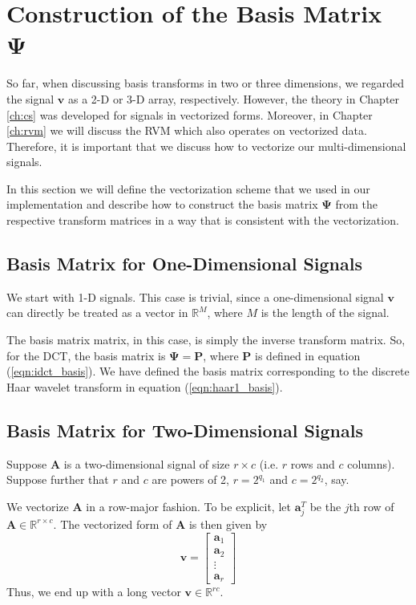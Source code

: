 \section{Construction of the Basis Matrix \texorpdfstring{$\bm\Psi$}{[Psi]}}
So far, when discussing basis transforms in two or three dimensions, we regarded the signal $\bm v$ as a 2-D or 3-D array, respectively.
However, the theory in Chapter \ref{ch:cs} was developed for signals in vectorized forms.
Moreover, in Chapter \ref{ch:rvm} we will discuss the RVM which also operates on vectorized data.
Therefore, it is important that we discuss how to vectorize our multi-dimensional signals.

In this section we will define the vectorization scheme that we used in our implementation and describe how to construct the basis matrix $\bm\Psi$ from the respective transform matrices in a way that is consistent with the vectorization.

\subsection{Basis Matrix for One-Dimensional Signals}
We start with 1-D signals. 
This case is trivial, since a one-dimensional signal $\bm v$ can directly be treated as a vector in $\mathbb{R}^M$, where $M$ is the length of the signal.

The basis matrix matrix, in this case, is simply the inverse transform matrix.
So, for the DCT, the basis matrix is $\bm\Psi = \bm P$, where $\bm P$ is defined in equation (\ref{eqn:idct_basis}).
We have defined the basis matrix corresponding to the discrete Haar wavelet transform in equation (\ref{eqn:haar1_basis}).

\subsection{Basis Matrix for Two-Dimensional Signals}
\label{sect:vectorize2d}
Suppose $\bm A$ is a two-dimensional signal of size $r\times c$ (i.e. $r$ rows and $c$ columns).
Suppose further that $r$ and $c$ are powers of 2, $r=2^{q_1}$ and $c = 2^{q_2}$, say.

We vectorize $\bm A$ in a row-major fashion.
To be explicit, let $\bm a_j^T$ be the $j$th row of $\bm A\in\mathbb{R}^{r\times c}$.
The vectorized form of $\bm A$ is then given by
\begin{equation*}
  \bm v = \begin{bmatrix}
    \bm a_1 \\
    \bm a_2 \\
    \vdots \\
    \bm a_r
  \end{bmatrix}
\end{equation*}
Thus, we end up with a long vector $\bm v \in \mathbb{R}^{rc}$.


